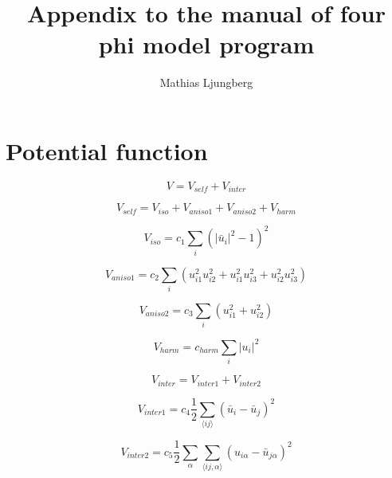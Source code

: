 \documentclass[a4paper, 10pt]{article}
\begin{document}



\title{Appendix to the manual of four phi model program} 
\author{Mathias Ljungberg}
\maketitle



\section*{Potential function}

\begin{equation}
V = V_{self} + V_{inter}
\end{equation}

\begin{equation}
V_{self} = V_{iso} + V_{aniso1} + V_{aniso2} + V_{harm}
\end{equation}

\begin{equation}
V_{iso} = c_1 \sum_i ( |\bar u_i  |^2 -1 )^2
\end{equation}

\begin{equation}
V_{aniso1} = c_2 \sum_i (  u_{i1}^2 u_{i2}^2 + u_{i1}^2u_{i3}^2 + u_{i2}^2u_{i3}^2 )  
\end{equation}

\begin{equation}
V_{aniso2} = c_3 \sum_i (  u_{i1}^2 + u_{i2}^2 )  
\end{equation}

\begin{equation}
V_{harm} = c_{harm} \sum_i  |u_{i} |^2   
\end{equation}

\begin{equation}
V_{inter} = V_{inter1} + V_{inter2}
\end{equation}

\begin{equation}
V_{inter1} = c_4 \frac{1}{2} \sum_{\langle ij \rangle} (\bar u_i -\bar u_j)^2 
\end{equation}

\begin{equation}
V_{inter2} = c_5 \frac{1}{2} \sum_{\alpha} \sum_{\langle ij, \alpha \rangle} (u_{i\alpha} -\bar u_{j\alpha})^2 
\end{equation}
\end{document}
